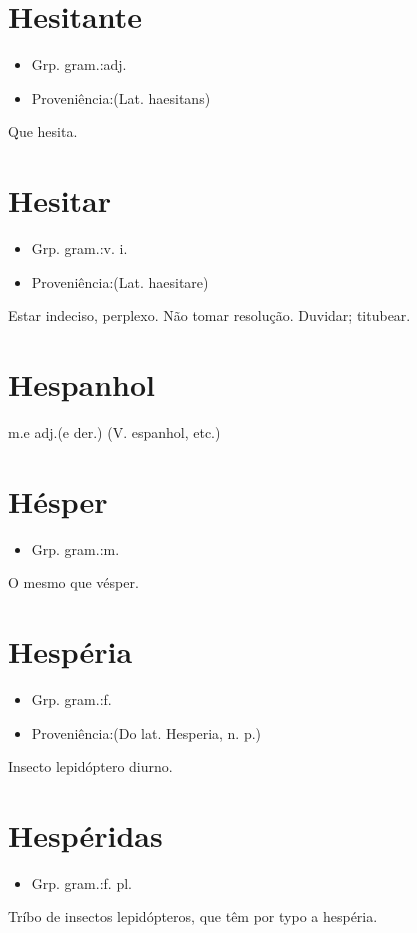 \documentclass{article}
\begin{document}
\section{Hesitante}
\begin{itemize}
\item {Grp. gram.:adj.}
\end{itemize}
\begin{itemize}
\item {Proveniência:(Lat. \textunderscore haesitans\textunderscore )}
\end{itemize}
Que hesita.
\section{Hesitar}
\begin{itemize}
\item {Grp. gram.:v. i.}
\end{itemize}
\begin{itemize}
\item {Proveniência:(Lat. \textunderscore haesitare\textunderscore )}
\end{itemize}
Estar indeciso, perplexo.
Não tomar resolução.
Duvidar; titubear.
\section{Hespanhol}
\textunderscore m.\textunderscore  e \textunderscore adj.\textunderscore  (e der.)
(V. \textunderscore espanhol\textunderscore , etc.)
\section{Hésper}
\begin{itemize}
\item {Grp. gram.:m.}
\end{itemize}
O mesmo que \textunderscore vésper\textunderscore .
\section{Hespéria}
\begin{itemize}
\item {Grp. gram.:f.}
\end{itemize}
\begin{itemize}
\item {Proveniência:(Do lat. \textunderscore Hesperia\textunderscore , n. p.)}
\end{itemize}
Insecto lepidóptero diurno.
\section{Hespéridas}
\begin{itemize}
\item {Grp. gram.:f. pl.}
\end{itemize}
Tríbo de insectos lepidópteros, que têm por typo a hespéria.
\end{document}

